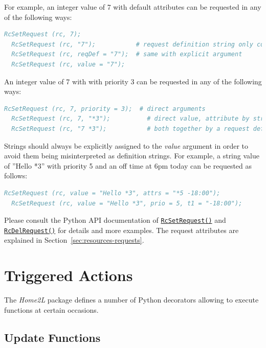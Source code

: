\documentclass[12pt,english,parskip=half,headheight=19pt]{scrreprt}
\newcommand{\refapic}[1]{\href{home2l-api_c/index.html}{\mbox{\texttt{#1}}}}            %
\newcommand{\refapipython}[1]{\href{home2l-api_python/index.html}{\mbox{\texttt{#1}}}}  %
\begin{document}
For example, an integer value of 7 with default attributes can be requested in any of the following ways:
\begin{lstlisting}[language=comments]
  RcSetRequest (rc, 7);
  RcSetRequest (rc, "7");           # request definition string only containing the value
  RcSetRequest (rc, reqDef = "7");  # same with explicit argument
  RcSetRequest (rc, value = "7");
\end{lstlisting}

An integer value of 7 with with priority 3 can be requested in any of the following ways:
\begin{lstlisting}[language=comments]
  RcSetRequest (rc, 7, priority = 3);  # direct arguments
  RcSetRequest (rc, 7, "*3");          # direct value, attribute by string
  RcSetRequest (rc, "7 *3");           # both together by a request definition string
\end{lstlisting}

Strings should always be explicitly assigned to the \textit{value} argument in order to avoid them being misinterpreted as definition strings. For example, a string value of ''Hello *3'' with priority 5 and an off time at 6pm today can be requested as follows:
\begin{lstlisting}[language=comments]
  RcSetRequest (rc, value = "Hello *3", attrs = "*5 -18:00");
  RcSetRequest (rc, value = "Hello *3", prio = 5, t1 = "-18:00");
\end{lstlisting}

Please consult the Python API documentation of \refapipython{RcSetRequest()} and \refapic{RcDelRequest()} for details and more examples. The request attributes are explained in Section~\ref{sec:resources-requests}.



\section{Triggered Actions}
\label{sec:rules-actions}


The \textit{Home2L} package defines a number of Python decorators allowing to execute functions at certain occasions.


\subsection{Update Functions}
\label{sec:rules-actions-onupdate}
\end{document}
